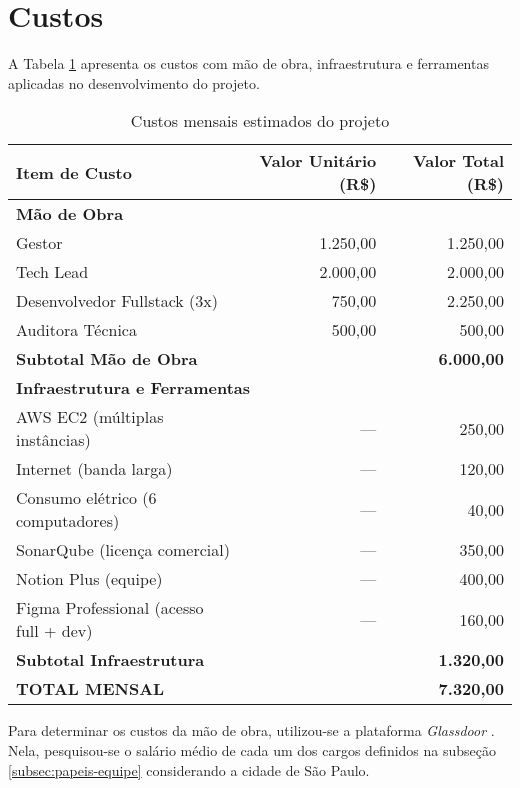 \section{Custos}

\label{sec:custos}

A Tabela \ref{tab:custo-mensal-projeto} apresenta os custos com mão de obra, infraestrutura e ferramentas aplicadas no desenvolvimento do projeto.

\begin{table}[htbp]
	\centering
	\caption{Custos mensais estimados do projeto}
	\label{tab:custo-mensal-projeto}
	\begin{tabular}{lrr}
		\toprule
		\textbf{Item de Custo} & \textbf{Valor Unitário (R\$)} & \textbf{Valor Total (R\$)} \\
		\midrule
		\multicolumn{3}{l}{\textbf{Mão de Obra}} \\
		\quad Gestor & 1.250,00 & 1.250,00 \\
		\quad Tech Lead & 2.000,00 & 2.000,00 \\
		\quad Desenvolvedor Fullstack (3x) & 750,00 & 2.250,00 \\
		\quad Auditora Técnica & 500,00 & 500,00 \\
		\cmidrule{3-3}
		\multicolumn{2}{l}{\textbf{Subtotal Mão de Obra}} & \textbf{6.000,00} \\
		\midrule
		\multicolumn{3}{l}{\textbf{Infraestrutura e Ferramentas}} \\
		\quad AWS EC2 (múltiplas instâncias) & --- & 250,00 \\
		\quad Internet (banda larga) & --- & 120,00 \\
		\quad Consumo elétrico (6 computadores) & --- & 40,00 \\
		\quad SonarQube (licença comercial) & --- & 350,00 \\
		\quad Notion Plus (equipe) & --- & 400,00 \\
		\quad Figma Professional (acesso full + dev) & --- & 160,00 \\
		\cmidrule{3-3}
		\multicolumn{2}{l}{\textbf{Subtotal Infraestrutura}} & \textbf{1.320,00} \\
		\midrule
		\multicolumn{2}{l}{\textbf{TOTAL MENSAL}} & \textbf{7.320,00} \\
		\bottomrule
	\end{tabular}
\end{table}

Para determinar os custos da mão de obra, utilizou-se a plataforma \emph{Glassdoor} \cite{glassdoor-2025}. Nela, pesquisou-se o salário médio de cada um dos cargos definidos na subseção \ref{subsec:papeis-equipe} considerando a cidade de São Paulo.

